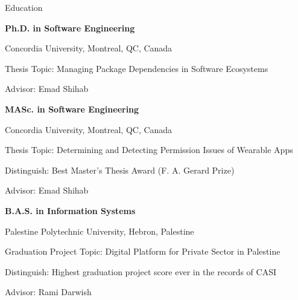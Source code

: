 \begin{rubric}{Education}

	\entry*[2018 -- Present]%
	\textbf{Ph.D. in Software Engineering}
	\par Concordia University, Montreal, QC, Canada
	\par Thesis Topic: Managing Package Dependencies in Software Ecosystems
	\par Advisor: Emad Shihab

	\entry*[2016 -- 2017]%
	\textbf{MASc. in Software Engineering}
	\par Concordia University, Montreal, QC, Canada
	\par Thesis Topic: Determining and Detecting Permission Issues of Wearable Apps
	\par Distinguish: Best Master’s Thesis Award (F. A. Gerard Prize)
	\par Advisor: Emad Shihab

	\entry*[2011 -- 2015]%
	\textbf{B.A.S. in Information Systems}
	\par Palestine Polytechnic University, Hebron, Palestine
	\par Graduation Project Topic: Digital Platform for Private Sector in Palestine
	\par Distinguish: Highest graduation project score ever in the records of CASI
	\par Advisor: Rami Darwish
\end{rubric}
